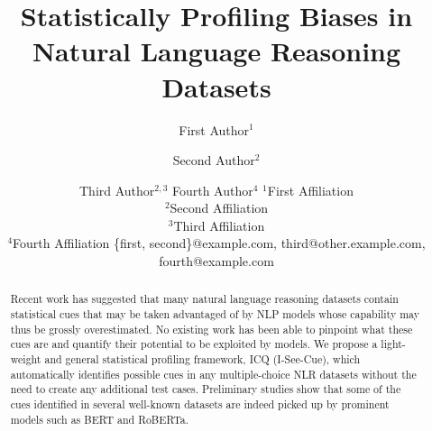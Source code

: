 \documentclass[11pt]{article}
\title{Statistically Profiling Biases in Natural Language Reasoning Datasets}
\author{
First Author$^1$
\and
Second Author$^2$\and
Third Author$^{2,3}$\And
Fourth Author$^4$
\affiliations
$^1$First Affiliation\\
$^2$Second Affiliation\\
$^3$Third Affiliation\\
$^4$Fourth Affiliation
\emails
\{first, second\}@example.com,
third@other.example.com,
fourth@example.com
}
\begin{document}
\maketitle
\begin{abstract}
Recent work has suggested that many natural language 
reasoning datasets contain statistical cues that
may be taken advantaged of by NLP models whose
capability may thus be grossly overestimated. 
No existing work has been able to pinpoint what these cues are
and quantify their potential to be exploited by
models. 
We propose a light-weight and general statistical profiling framework, 
ICQ (I-See-Cue), which automatically identifies possible cues
in any multiple-choice NLR datasets without 
the need to create any additional test cases. Preliminary
studies show that some of the cues identified in several well-known
datasets are indeed picked up by prominent models such as BERT and
RoBERTa. 
\end{abstract}










\end{document}
